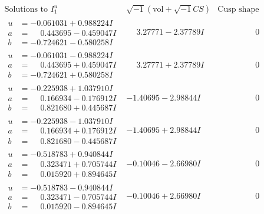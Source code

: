 \documentclass[1p]{elsarticle_modified}
\theoremstyle{definition}
\newcommand{\I}{\sqrt{-1}}
\begin{document}
$$\begin{array}{c|c|c}  
\text{Solutions to }I^u_{1}& \I (\text{vol} + \sqrt{-1}CS) & \text{Cusp shape}\\
 \hline 
\begin{aligned}
u &= -0.061031 + 0.988224 I \\
a &= \phantom{-}0.443695 - 0.459047 I \\
b &= -0.724621 - 0.580258 I\end{aligned}
 & \phantom{-}3.27771 - 2.37789 I & \phantom{-0.000000 } 0 \\ \hline\begin{aligned}
u &= -0.061031 - 0.988224 I \\
a &= \phantom{-}0.443695 + 0.459047 I \\
b &= -0.724621 + 0.580258 I\end{aligned}
 & \phantom{-}3.27771 + 2.37789 I & \phantom{-0.000000 } 0 \\ \hline\begin{aligned}
u &= -0.225938 + 1.037910 I \\
a &= \phantom{-}0.166934 - 0.176912 I \\
b &= \phantom{-}0.821680 + 0.445687 I\end{aligned}
 & -1.40695 - 2.98844 I & \phantom{-0.000000 } 0 \\ \hline\begin{aligned}
u &= -0.225938 - 1.037910 I \\
a &= \phantom{-}0.166934 + 0.176912 I \\
b &= \phantom{-}0.821680 - 0.445687 I\end{aligned}
 & -1.40695 + 2.98844 I & \phantom{-0.000000 } 0 \\ \hline\begin{aligned}
u &= -0.518783 + 0.940844 I \\
a &= \phantom{-}0.323471 + 0.705744 I \\
b &= \phantom{-}0.015920 + 0.894645 I\end{aligned}
 & -0.10046 - 2.66980 I & \phantom{-0.000000 } 0 \\ \hline\begin{aligned}
u &= -0.518783 - 0.940844 I \\
a &= \phantom{-}0.323471 - 0.705744 I \\
b &= \phantom{-}0.015920 - 0.894645 I\end{aligned}
 & -0.10046 + 2.66980 I & \phantom{-0.000000 } 0 \\ \hline\begin{aligned}

\end{aligned}
\end{array}$$
\end{document}
